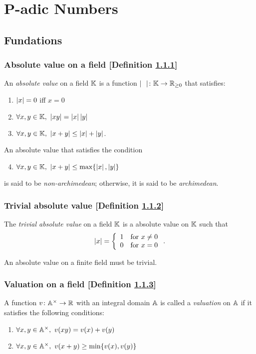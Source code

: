 \section{P-adic Numbers}
\subsection{Fundations}
\subsubsection{Absolute value on a field [Definition \ref{absolute-value-on-a-field}]}\label{absolute-value-on-a-field}
An \textit{absolute value} on a field $\mathbb{K}$ is a function $\mid \ \ \mid \colon \mathbb{K} \to \mathbb{R}_{\ge0}$ that satisfies:
\begin{enumerate}
\item $\left| x \right| = 0$ iff $x = 0$
\item $\forall x, y \in \mathbb{K},\ \left| xy \right| = \left| x \right|\left| y \right|$
\item $\forall x, y \in \mathbb{K},\ \left| x+y \right| \le \left| x \right|+\left| y \right|$.
\end{enumerate}

An absolute value that satisfies the condition
\begin{enumerate}
\setcounter{enumi}{3}
\item $\forall x, y \in \mathbb{K},\ \left| x+y \right| \le \max \{ \left| x \right|,\left| y \right| \}$
\end{enumerate}
is said to be \textit{non-archimedean}; otherwise, it is said to be \textit{archimedean}.

\subsubsection{Trivial absolute value [Definition \ref{trivial-absolute-value}]}\label{trivial-absolute-value}
The \textit{trivial absolute value} on a field $\mathbb{K}$ is a absolute value on $\mathbb{K}$ such that
\[
\left| x \right| = \left\{ \begin{array}{ll}
 1 & \text{for}\ x \neq 0 \\
 0 & \text{for}\ x = 0
 \end{array} \right..
\]

An absolute value on a finite field must be trivial.

\subsubsection{Valuation on a field [Definition \ref{valuation-on-a-field}]}\label{valuation-on-a-field}
A function $v \colon \mathbb{A}^\times \to \mathbb{R}$ with an integral domain $\mathbb{A}$ is called a \textit{valuation} on $\mathbb{A}$ if it satisfies the following conditions:
\begin{enumerate}
\item $\forall x, y \in \mathbb{A}^\times,\ v(xy) = v(x) + v(y)$
\item $\forall x, y \in \bb{A}^\times,\ v(x+y) \ge \min \{ v(x), v(y) \}$
\end{enumerate}

